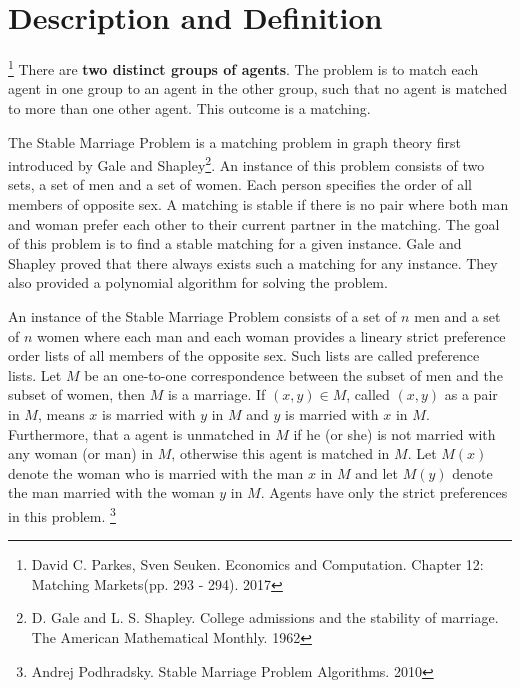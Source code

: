 \section{Description and Definition}
\begin{description}[leftmargin=1em+5mm, labelindent=5mm]
    \item[Two-side-matching Markets - Definiton]   \footnote{David C. Parkes, Sven Seuken. Economics and Computation. Chapter 12: Matching Markets(pp. 293 - 294). 2017} There are \textbf{two distinct groups of agents}. The problem is to match each agent in one group to an agent in the other group,
    such that no agent is matched to more than one other agent. This outcome is a matching.
    \item[Stable Marriage Problem - Description] The Stable Marriage Problem is a matching problem in graph theory first introduced
    by Gale and Shapley\footnote{D. Gale and L. S. Shapley. College admissions and the stability of marriage. The American Mathematical Monthly. 1962}. An instance of this problem consists of two sets, a set of men
    and a set of women. Each person specifies the order of all members of opposite sex. A
    matching is stable if there is no pair where both man and woman prefer each other
    to their current partner in the matching. The goal of this problem is to find a stable
    matching for a given instance. Gale and Shapley proved that there always exists such a
    matching for any instance. They also provided a polynomial algorithm for solving the
    problem. 
    \item[Stable Marriage Problem - Definition] An instance of the Stable Marriage Problem consists of a set of $n$
    men and a set of $n$ women where each man and each woman provides a lineary strict preference order 
    lists of all members of the opposite sex. Such lists are called preference lists.
    Let $M$ be an one-to-one correspondence between the subset of men and the subset
    of women, then $M$ is a marriage. If $(x, y) \in M$, called $(x, y)$
    as a pair in $M$, means $x$ is married with $y$ in $M$ and $y$ is married with $x$ in $M$.
    Furthermore, that a agent is unmatched in $M$ if he (or she) is not married
    with any woman (or man) in $M$, otherwise this agent is matched in $M$. Let $M(x)$
    denote the woman who is married with the man $x$ in $M$ and let $M(y)$ denote the man married
    with the woman $y$ in $M$. Agents have only the strict preferences in this problem.
    \footnote{Andrej Podhradsky. Stable Marriage Problem Algorithms. 2010}
\end{description}


